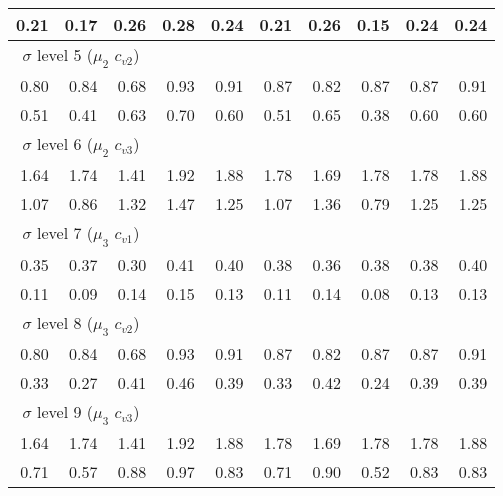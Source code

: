 \documentclass[preprint,12pt]{elsarticle}
\begin{document}
\begin{table}[htbp]
\begin{tabular}{rrrrrrrrrr}
    0.21  & 0.17  & 0.26  & 0.28  & 0.24  & 0.21  & 0.26  & 0.15  & 0.24  & 0.24 \\
    \midrule
    \multicolumn{3}{c}{$\sigma$ level 5 ($\mu_{2}$ $c_{v2}$)}      &       &       &       &       &       &       &  \\
    \midrule
    0.80  & 0.84  & 0.68  & 0.93  & 0.91  & 0.87  & 0.82  & 0.87  & 0.87  & 0.91 \\
    0.51  & 0.41  & 0.63  & 0.70  & 0.60  & 0.51  & 0.65  & 0.38  & 0.60  & 0.60 \\
    \midrule
    \multicolumn{3}{c}{$\sigma$ level 6 ($\mu_{2}$ $c_{v3}$)}       &       &       &       &       &       &       &  \\
    \midrule
    1.64  & 1.74  & 1.41  & 1.92  & 1.88  & 1.78  & 1.69  & 1.78  & 1.78  & 1.88 \\
    1.07  & 0.86  & 1.32  & 1.47  & 1.25  & 1.07  & 1.36  & 0.79  & 1.25  & 1.25 \\
   \midrule
   \multicolumn{3}{c}{$\sigma$ level 7 ($\mu_{3}$ $c_{v1}$)}      &       &       &       &       &       &       &  \\
   \midrule
    0.35  & 0.37  & 0.30  & 0.41  & 0.40  & 0.38  & 0.36  & 0.38  & 0.38  & 0.40 \\
    0.11  & 0.09  & 0.14  & 0.15  & 0.13  & 0.11  & 0.14  & 0.08  & 0.13  & 0.13 \\
   \midrule
   \multicolumn{3}{c}{$\sigma$ level 8 ($\mu_{3}$ $c_{v2}$)}      &       &       &       &       &       &       &  \\
        \midrule
    0.80  & 0.84  & 0.68  & 0.93  & 0.91  & 0.87  & 0.82  & 0.87  & 0.87  & 0.91 \\
    0.33  & 0.27  & 0.41  & 0.46  & 0.39  & 0.33  & 0.42  & 0.24  & 0.39  & 0.39 \\
        \midrule
      \multicolumn{3}{c}{$\sigma$ level 9 ($\mu_{3}$ $c_{v3}$)}      &       &       &       &       &       &       &  \\
        \midrule
    1.64  & 1.74  & 1.41  & 1.92  & 1.88  & 1.78  & 1.69  & 1.78  & 1.78  & 1.88 \\
    0.71  & 0.57  & 0.88  & 0.97  & 0.83  & 0.71  & 0.90  & 0.52  & 0.83  & 0.83 \\
    \bottomrule
    \end{tabular}%
  \label{tab:addlabel}%
\end{table}%


\end{document}

